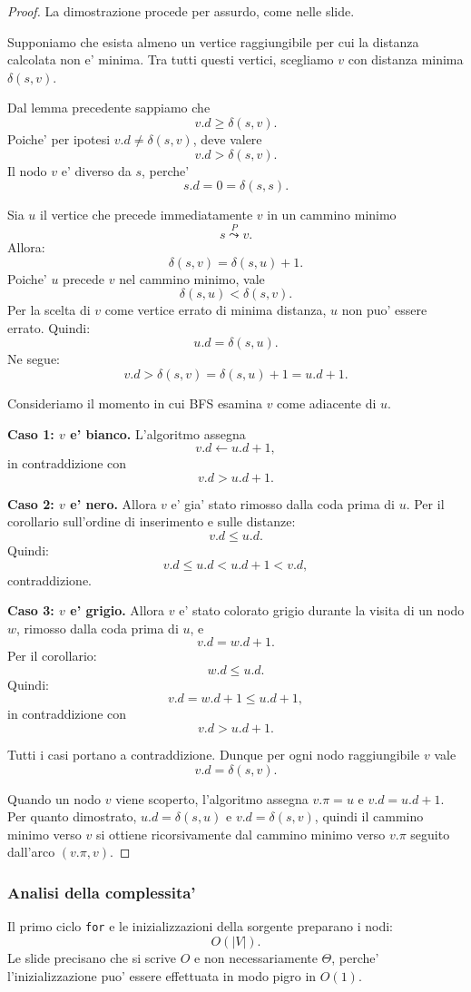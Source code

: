 \begin{proof}
La dimostrazione procede per assurdo, come nelle slide.

Supponiamo che esista almeno un vertice raggiungibile per cui la distanza calcolata non e' minima. Tra tutti questi vertici, scegliamo $v$ con distanza minima $\delta(s,v)$.

Dal lemma precedente sappiamo che
\[
v.d\ge \delta(s,v).
\]
Poiche' per ipotesi $v.d\neq \delta(s,v)$, deve valere
\[
v.d>\delta(s,v).
\]
Il nodo $v$ e' diverso da $s$, perche'
\[
s.d=0=\delta(s,s).
\]

Sia $u$ il vertice che precede immediatamente $v$ in un cammino minimo
\[
s\overset{P}{\leadsto}v.
\]
Allora:
\[
\delta(s,v)=\delta(s,u)+1.
\]
Poiche' $u$ precede $v$ nel cammino minimo, vale
\[
\delta(s,u)<\delta(s,v).
\]
Per la scelta di $v$ come vertice errato di minima distanza, $u$ non puo' essere errato. Quindi:
\[
u.d=\delta(s,u).
\]
Ne segue:
\[
v.d>\delta(s,v)=\delta(s,u)+1=u.d+1.
\]

Consideriamo il momento in cui BFS esamina $v$ come adiacente di $u$.

\textbf{Caso 1: $v$ e' bianco.}
L'algoritmo assegna
\[
v.d\gets u.d+1,
\]
in contraddizione con
\[
v.d>u.d+1.
\]

\textbf{Caso 2: $v$ e' nero.}
Allora $v$ e' gia' stato rimosso dalla coda prima di $u$. Per il corollario sull'ordine di inserimento e sulle distanze:
\[
v.d\le u.d.
\]
Quindi:
\[
v.d\le u.d<u.d+1<v.d,
\]
contraddizione.

\textbf{Caso 3: $v$ e' grigio.}
Allora $v$ e' stato colorato grigio durante la visita di un nodo $w$, rimosso dalla coda prima di $u$, e
\[
v.d=w.d+1.
\]
Per il corollario:
\[
w.d\le u.d.
\]
Quindi:
\[
v.d=w.d+1\le u.d+1,
\]
in contraddizione con
\[
v.d>u.d+1.
\]

Tutti i casi portano a contraddizione. Dunque per ogni nodo raggiungibile $v$ vale
\[
v.d=\delta(s,v).
\]

Quando un nodo $v$ viene scoperto, l'algoritmo assegna $v.\pi=u$ e $v.d=u.d+1$. Per quanto dimostrato, $u.d=\delta(s,u)$ e $v.d=\delta(s,v)$, quindi il cammino minimo verso $v$ si ottiene ricorsivamente dal cammino minimo verso $v.\pi$ seguito dall'arco $(v.\pi,v)$.
\end{proof}

\subsubsection{Analisi della complessita'}
Il primo ciclo \texttt{for} e le inizializzazioni della sorgente preparano i nodi:
\[
O(|V|).
\]
Le slide precisano che si scrive $O$ e non necessariamente $\Theta$, perche' l'inizializzazione puo' essere effettuata in modo pigro in $O(1)$.


